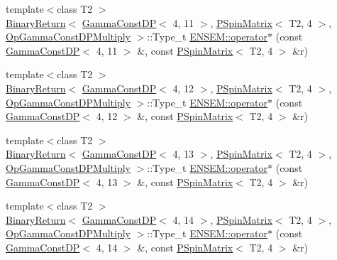 \begin{DoxyCompactItemize}
\item 
{\footnotesize template$<$class T2 $>$ }\\\mbox{\hyperlink{structENSEM_1_1BinaryReturn}{Binary\+Return}}$<$ \mbox{\hyperlink{classENSEM_1_1GammaConstDP}{Gamma\+Const\+DP}}$<$ 4, 11 $>$, \mbox{\hyperlink{classENSEM_1_1PSpinMatrix}{P\+Spin\+Matrix}}$<$ T2, 4 $>$, \mbox{\hyperlink{structENSEM_1_1OpGammaConstDPMultiply}{Op\+Gamma\+Const\+D\+P\+Multiply}} $>$\+::Type\+\_\+t \mbox{\hyperlink{group__primspinmatrix_ga763e216e29f923dec37a54603419bb2c}{E\+N\+S\+E\+M\+::operator$\ast$}} (const \mbox{\hyperlink{classENSEM_1_1GammaConstDP}{Gamma\+Const\+DP}}$<$ 4, 11 $>$ \&, const \mbox{\hyperlink{classENSEM_1_1PSpinMatrix}{P\+Spin\+Matrix}}$<$ T2, 4 $>$ \&r)
\item 
{\footnotesize template$<$class T2 $>$ }\\\mbox{\hyperlink{structENSEM_1_1BinaryReturn}{Binary\+Return}}$<$ \mbox{\hyperlink{classENSEM_1_1GammaConstDP}{Gamma\+Const\+DP}}$<$ 4, 12 $>$, \mbox{\hyperlink{classENSEM_1_1PSpinMatrix}{P\+Spin\+Matrix}}$<$ T2, 4 $>$, \mbox{\hyperlink{structENSEM_1_1OpGammaConstDPMultiply}{Op\+Gamma\+Const\+D\+P\+Multiply}} $>$\+::Type\+\_\+t \mbox{\hyperlink{group__primspinmatrix_gac9db04966aafec7cc5029c5dc0e37d4d}{E\+N\+S\+E\+M\+::operator$\ast$}} (const \mbox{\hyperlink{classENSEM_1_1GammaConstDP}{Gamma\+Const\+DP}}$<$ 4, 12 $>$ \&, const \mbox{\hyperlink{classENSEM_1_1PSpinMatrix}{P\+Spin\+Matrix}}$<$ T2, 4 $>$ \&r)
\item 
{\footnotesize template$<$class T2 $>$ }\\\mbox{\hyperlink{structENSEM_1_1BinaryReturn}{Binary\+Return}}$<$ \mbox{\hyperlink{classENSEM_1_1GammaConstDP}{Gamma\+Const\+DP}}$<$ 4, 13 $>$, \mbox{\hyperlink{classENSEM_1_1PSpinMatrix}{P\+Spin\+Matrix}}$<$ T2, 4 $>$, \mbox{\hyperlink{structENSEM_1_1OpGammaConstDPMultiply}{Op\+Gamma\+Const\+D\+P\+Multiply}} $>$\+::Type\+\_\+t \mbox{\hyperlink{group__primspinmatrix_ga6ecc3bf3d92d81202c48dce547f7027f}{E\+N\+S\+E\+M\+::operator$\ast$}} (const \mbox{\hyperlink{classENSEM_1_1GammaConstDP}{Gamma\+Const\+DP}}$<$ 4, 13 $>$ \&, const \mbox{\hyperlink{classENSEM_1_1PSpinMatrix}{P\+Spin\+Matrix}}$<$ T2, 4 $>$ \&r)
\item 
{\footnotesize template$<$class T2 $>$ }\\\mbox{\hyperlink{structENSEM_1_1BinaryReturn}{Binary\+Return}}$<$ \mbox{\hyperlink{classENSEM_1_1GammaConstDP}{Gamma\+Const\+DP}}$<$ 4, 14 $>$, \mbox{\hyperlink{classENSEM_1_1PSpinMatrix}{P\+Spin\+Matrix}}$<$ T2, 4 $>$, \mbox{\hyperlink{structENSEM_1_1OpGammaConstDPMultiply}{Op\+Gamma\+Const\+D\+P\+Multiply}} $>$\+::Type\+\_\+t \mbox{\hyperlink{group__primspinmatrix_ga3572342590fe6c5683d22d857b757675}{E\+N\+S\+E\+M\+::operator$\ast$}} (const \mbox{\hyperlink{classENSEM_1_1GammaConstDP}{Gamma\+Const\+DP}}$<$ 4, 14 $>$ \&, const \mbox{\hyperlink{classENSEM_1_1PSpinMatrix}{P\+Spin\+Matrix}}$<$ T2, 4 $>$ \&r)

\end{DoxyCompactItemize}
